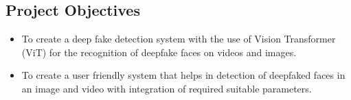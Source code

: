 \subsection{Project Objectives}
\justify
\begin{itemize}
    \item To create a deep fake detection system with the use of Vision Transformer (ViT) for the recognition of deepfake faces on videos and images.
    \item To create a user friendly system that helps in detection of deepfaked faces in an image and video with integration of required suitable parameters.
\end{itemize}
